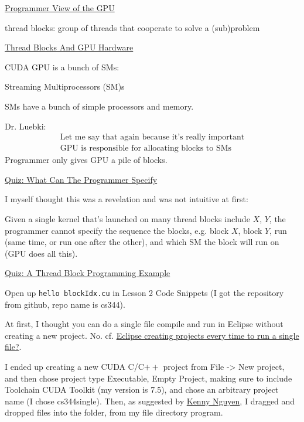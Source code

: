 \documentclass[10pt]{amsart}
\begin{document}
\begin{multicols*}{2}
\href{https://classroom.udacity.com/courses/cs344/lessons/77202674/concepts/773153760923}{Programmer View of the GPU}

thread blocks: group of threads that cooperate to solve a (sub)problem

\href{https://classroom.udacity.com/courses/cs344/lessons/77202674/concepts/773153770923}{Thread Blocks And GPU Hardware}

CUDA GPU is a bunch of SMs:

Streaming Multiprocessors (SM)s

SMs have a bunch of simple processors and memory.

Dr. Luebki:
\[
\boxed{ \begin{gathered}
    \text{Let me say that again because it's really important} \\
    \text{GPU is responsible for allocating blocks to SMs}
  \end{gathered}
  }
\]
Programmer only gives GPU a pile of blocks.

\href{https://classroom.udacity.com/courses/cs344/lessons/77202674/concepts/787721730923}{Quiz: What Can The Programmer Specify}

I myself thought this was a revelation and was not intuitive at first:

Given a single kernel that's launched on many thread blocks include $X$, $Y$, the programmer cannot specify the sequence the blocks, e.g. block $X$, block $Y$, run (same time, or run one after the other), and which SM the block will run on (GPU does all this).  

\href{https://classroom.udacity.com/courses/cs344/lessons/77202674/concepts/787981160923}{Quiz: A Thread Block Programming Example}

Open up \verb|hello blockIdx.cu| in Lesson 2 Code Snippets (I got the repository from github, repo name is cs344).

At first, I thought you can do a single file compile and run in Eclipse without creating a new project.  No.  cf. \href{http://stackoverflow.com/questions/17164197/eclipse-creating-projects-every-time-to-run-a-single-file}{Eclipse creating projects every time to run a single file?}.  


I ended up creating a new CUDA C/C$++$ project from File -> New project, and then chose project type Executable, Empty Project, making sure to include Toolchain CUDA Toolkit (my version is 7.5), and chose an arbitrary project name (I chose cs344single).  Then, as suggested by \href{http://stackoverflow.com/users/3720356/kenny-nguyen}{Kenny Nguyen}, I dragged and dropped files into the folder, from my file directory program.


\end{multicols*}
\end{document}
